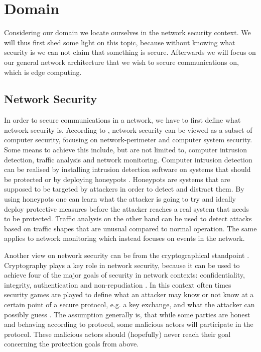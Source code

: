 \section{Domain}
Considering our domain we locate ourselves in the network security context. We will thus first shed some light on this topic, because without knowing what security is we can not claim that something is secure. Afterwards we will focus on our general network architecture that we wish to secure communications on, which is edge computing.

\subsection{Network Security}
In order to secure communications in a network, we have to first define what network security is. According to \cite{netsec}, network security can be viewed as a subset of computer security, focusing on network-perimeter and computer system security. Some means to achieve this include, but are not limited to, computer intrusion detection, traffic analysis and network monitoring. Computer intrusion detection can be realised by installing intrusion detection software on systems that should be protected or by deploying honeypots \cite{honeypot}. Honeypots are systems that are supposed to be targeted by attackers in order to detect and distract them. By using honeypots one can learn what the attacker is going to try and ideally deploy protective measures before the attacker reaches a real system that needs to be protected. Traffic analysis on the other hand can be used to detect attacks based on traffic shapes that are unusual compared to normal operation. The same applies to network monitoring which instead focuses on events in the network.

Another view on network security can be from the cryptographical standpoint \cite{netsec}. Cryptography plays a key role in network security, because it can be used to achieve four of the major goals of security in network contexts: confidentiality, integrity, authentication and non-repudiation \cite{cryptography}. In this context often times security games are played to define what an attacker may know or not know at a certain point of a secure protocol, e.g. a key exchange, and what the attacker can possibly guess \cite{games}. The assumption generally is, that while some parties are honest and behaving according to protocol, some malicious actors will participate in the protocol. These malicious actors should (hopefully) never reach their goal concerning the protection goals from above.

